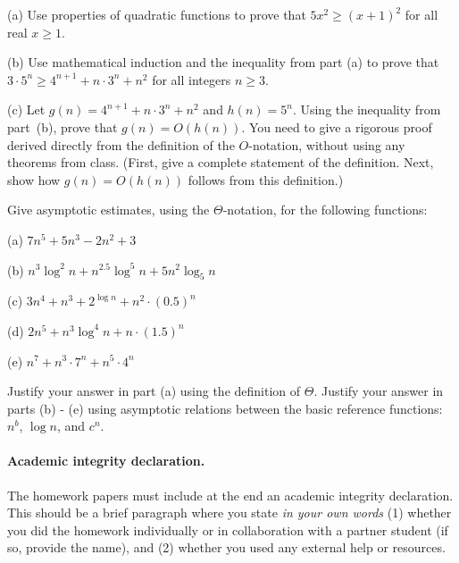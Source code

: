 \documentclass{article}
\begin{document}

\begin{problem} 
(a) Use properties of quadratic functions to prove that $5x^2 \geq (x + 1)^2$ for all real $x \ge 1$.

\smallskip
\noindent 
(b) Use mathematical induction and the inequality from part (a) to prove that $3\cdot 5^n \ge 4^{n+1} + n \cdot 3^n + n^2$ for all integers $n\ge 3$.

\smallskip
\noindent
(c)
Let $g(n) = 4^{n+1} + n \cdot 3^n + n^2$ and $h(n) = 5^n$.
Using the inequality from part~(b), prove that $g(n) = O(h(n))$.
You need to give a rigorous proof derived directly from 
the definition of the $O$-notation, without using any theorems from class.
(First, give a complete statement of the definition. 
Next, show how $g(n) = O(h(n))$ follows from this definition.)
\end{problem}


\begin{problem} 
Give asymptotic estimates, using the $\Theta$-notation, for the following functions:
%
\begin{description}\setlength{\itemsep}{-0.01in}
%
\item{(a)} $7n^5 + 5n^3 - 2n^2 + 3$
\item{(b)} $ n^3 {\log^2} n + {n^{2.5}}{\log^5 n}+ 5n^2 {\log_5 n}$
\item{(c)} $3 n^4 + n^3 + 2^ {\log n} + n^2 \cdot (0.5)^n $
\item{(d)} $2 n^5 + n^3 \log^4 n + n \cdot (1.5)^n   $
\item{(e)} $n^7 + n^3 \cdot 7^n + n^5 \cdot 4^n$
%
\end{description}
%
Justify your answer in part (a) using the definition of $\Theta$.
Justify your answer in parts (b) - (e) using asymptotic relations between
the basic reference functions: $n^b$, $\log n$, and $c^n$.
\end{problem}


\paragraph{Academic integrity declaration.}
The homework papers must include at the end an academic integrity declaration. This should be a brief paragraph where you state
\emph{in your own words}  (1) whether you did the homework individually or in collaboration with a partner student (if so, provide the name), 
and (2) whether you used any external help or resources. 
\end{document}
